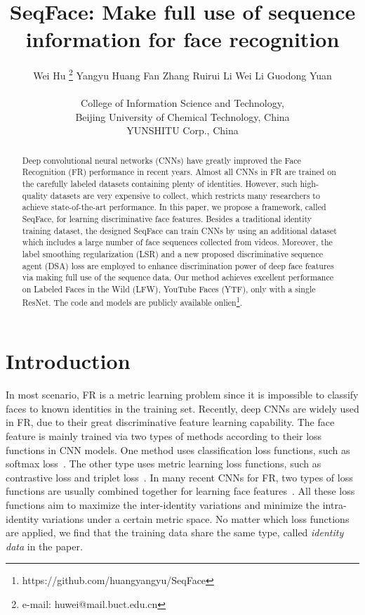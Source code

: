 \documentclass[conference]{acmsiggraph}
\title{SeqFace: Make full use of sequence information for face recognition}
\author{
\vspace{1mm} Wei Hu            \thanks{e-mail: huwei@mail.buct.edu.cn}
\hspace{8mm} Yangyu Huang
\hspace{8mm} Fan Zhang
\hspace{8mm} Ruirui Li
\hspace{8mm} Wei Li
\hspace{8mm} Guodong Yuan
\\
\begin{minipage}{8.5cm} \center College of Information Science and Technology, \\ Beijing University of Chemical Technology, China \end{minipage}\hspace{0.2cm}
\begin{minipage}{8.5cm} \center YUNSHITU Corp., China \end{minipage}\hspace{0.2cm}
\vspace{-3mm} }
\begin{document}
\maketitle

\begin{abstract}
Deep convolutional neural networks (CNNs) have greatly improved the Face Recognition (FR) performance in recent years. Almost all CNNs in FR are trained on the carefully labeled datasets containing plenty of identities. However, such high-quality datasets are very expensive to collect, which restricts many researchers to achieve state-of-the-art performance. In this paper, we propose a framework, called SeqFace, for learning discriminative face features. Besides a traditional identity training dataset, the designed SeqFace can train CNNs by using an additional dataset which includes a large number of face sequences collected from videos. Moreover, the label smoothing regularization (LSR) and a new proposed discriminative sequence agent (DSA) loss are employed to enhance discrimination power of deep face features via making full use of the sequence data. Our method achieves excellent performance on Labeled Faces in the Wild (LFW), YouTube Faces (YTF), only with a single ResNet. The code and models are publicly available onlien\footnote{https://github.com/huangyangyu/SeqFace}.
\end{abstract}



\keywordlist



\TOGlinkslist



\copyrightspace


\section{Introduction}
\label{sec:Introduction}

In most scenario, FR is a metric learning problem since it is impossible to classify faces to known identities in the training set. Recently, deep CNNs are widely used in FR, due to their great discriminative feature learning capability. The face feature is mainly trained via two types of methods according to their loss functions in CNN models. One method uses classification loss functions, such as softmax loss~\cite{deepface,frbyclass1,frbyclass2}. The other type uses metric learning loss functions, such as contrastive loss and triplet loss~\cite{tripletloss,contrastiveloss}. In many recent CNNs for FR, two types of loss functions are usually combined together for learning face features~\cite{centerloss}. All these loss functions aim to maximize the inter-identity variations and minimize the intra-identity variations under a certain metric space. No matter which loss functions are applied, we find that the training data share the same type, called \emph{identity data} in the paper.
\end{document}
